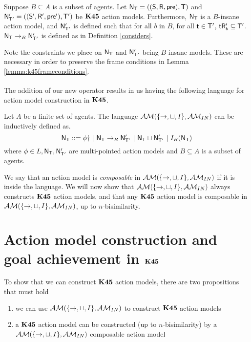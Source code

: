 \begin{defn} \label{defn:k45:considers}
	Suppose $B \subseteq A$ is a subset of agents.
	Let $\mathrm{\mathsf{N}}_\mathrm{\mathsf{T}} = ((\mathrm{\mathsf{S}},\mathrm{\mathsf{R}},\mathrm{\mathsf{pre}}),\mathrm{\mathsf{T}})$ and $\mathrm{\mathsf{N}}'_{\mathrm{\mathsf{T}}'} = ((\mathrm{\mathsf{S}}',\mathrm{\mathsf{R}}',\mathrm{\mathsf{pre}}'),\mathrm{\mathsf{T}}')$ be $\bf K45$ action models.
	Furthermore, $\mathrm{\mathsf{N}}_\mathrm{\mathsf{T}}$ is a $B$-insane action model, and $\mathrm{\mathsf{N}}'_{\mathrm{\mathsf{T}}'}$ is defined such that for
	all $b$ in $B$, for all $\mathrm{\mathsf{t}} \in \mathrm{\mathsf{T}}'$, $\mathrm{\mathsf{t}} \mathrm{\mathsf{R}}'_b \subseteq \mathrm{\mathsf{T}}'$.
	$\mathrm{\mathsf{N}}_\mathrm{\mathsf{T}} \to_B \mathrm{\mathsf{N}}'_{\mathrm{\mathsf{T}}'}$ is defined as in Definition \ref{considers}.
\end{defn}

Note the constraints we place on $\mathrm{\mathsf{N}}_\mathrm{\mathsf{T}}$ and $\mathrm{\mathsf{N}}'_{\mathrm{\mathsf{T}}'}$ being $B$-insane models.
These are necessary in order to preserve the frame conditions in Lemma
\ref{lemma:k45frameconditions}.\\
\\
The addition of our new operator results in us having the following language for
action model construction in $\bf K45$.
\begin{defn}
Let $A$ be a finite set of agents.
The language $\mathcal{AM}(\{\to,\sqcup,I\}, \mathcal{AM}_{IN})$ can be inductively defined as.
\[
	\mathrm{\mathsf{N}}_\mathrm{\mathsf{T}} ::= \phi \dag \text{ } | \text{ }\mathrm{\mathsf{N}}_\mathrm{\mathsf{T}} \to_B \mathrm{\mathsf{N}}'_{\mathrm{\mathsf{T}}'} \text{ }|
  \text{ } \mathrm{\mathsf{N}}_\mathrm{\mathsf{T}} \sqcup \mathrm{\mathsf{N}}'_{\mathrm{\mathsf{T}}'} \text{ } | \text{ } I_B(\mathrm{\mathsf{N}}_\mathrm{\mathsf{T}})
\]
where $\phi \in L, \mathrm{\mathsf{N}}_\mathrm{\mathsf{T}}, \mathrm{\mathsf{N}}'_{\mathrm{\mathsf{T}}'}$ are multi-pointed action models and $B \subseteq
A$ is a subset of agents.
\end{defn}

We say that an action model is {\em composable} in $\mathcal{AM}(\{\to, \sqcup, I\}, \mathcal{AM}_{IN})$ if it is
inside the language.
We will now show that $\mathcal{AM}(\{\to, \sqcup, I\}, \mathcal{AM}_{IN})$ always constructs $\bf K45$ action models, and that any
$\bf K45$ action model is composable in $\mathcal{AM}(\{\to,\sqcup,I\},\mathcal{AM}_{IN})$, up to $n$-bisimilarity.

\section{Action model construction and goal achievement in $\bf K45$} \label{subsec:k45:goalAchievement}

To show that we can construct $\bf K45$ action models, there are two propositions that
must hold
\begin{enumerate}
	\item we can use $\mathcal{AM}(\{\to, \sqcup, I\}, \mathcal{AM}_{IN})$ to construct $\bf K45$ action models
	\item a $\bf K45$ action model can be constructed (up to $n$-bisimilarity) by a $\mathcal{AM}(\{\to, \sqcup,
		I\}, \mathcal{AM}_{IN})$ composable action model
\end{enumerate}

